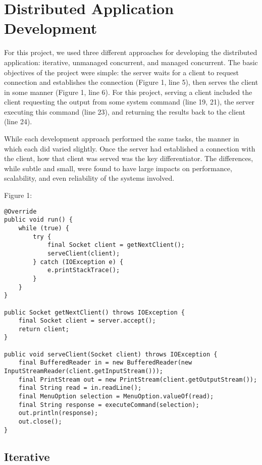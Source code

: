 \section{Distributed Application Development}

For this project, we used three different approaches for developing the distributed application: iterative, unmanaged concurrent, and managed concurrent. 
The basic objectives of the project were simple: the server waits for a client to request connection and establishes the connection (Figure 1, line 5), then serves the client in some manner (Figure 1, line 6). 
For this project, serving a client included the client requesting the output from some system command (line 19, 21), the server executing this command (line 23), and returning the results back to the client (line 24).

While each development approach performed the same tasks, the manner in which each did varied slightly. 
Once the server had established a connection with the client, how that client was served was the key differentiator.
The differences, while subtle and small, were found to have large impacts on performance, scalability, and even reliability of the systems involved.

Figure 1:
\begin{lstlisting}
@Override
public void run() {
	while (true) {
		try {
			final Socket client = getNextClient();
			serveClient(client);
		} catch (IOException e) {
			e.printStackTrace();
		}
	}
}

public Socket getNextClient() throws IOException {
	final Socket client = server.accept();
	return client;
}

public void serveClient(Socket client) throws IOException {
	final BufferedReader in = new BufferedReader(new InputStreamReader(client.getInputStream()));
	final PrintStream out = new PrintStream(client.getOutputStream());
	final String read = in.readLine();
	final MenuOption selection = MenuOption.valueOf(read);
	final String response = executeCommand(selection);
	out.println(response);
	out.close();
}
\end{lstlisting}

\subsection{Iterative}

